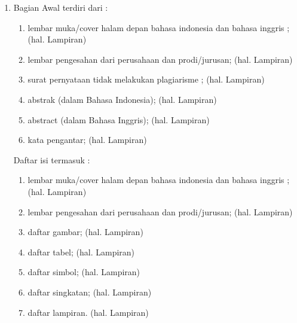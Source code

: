 \begin{enumerate}
\item
Bagian Awal terdiri dari :
\begin{enumerate}
\item lembar muka/cover halam depan bahasa indonesia dan bahasa inggris ; (hal. Lampiran)
\item lembar pengesahan dari perusahaan dan prodi/jurusan; (hal. Lampiran) 
\item surat pernyataan tidak melakukan plagiarisme ; (hal. Lampiran)
\item abstrak (dalam Bahasa Indonesia); (hal. Lampiran)
\item abstract (dalam Bahasa Inggris); (hal. Lampiran)
\item kata pengantar; (hal. Lampiran)
\end{enumerate}
Daftar isi termasuk :
\begin{enumerate}
\item lembar muka/cover halam depan bahasa indonesia dan bahasa inggris ; (hal. Lampiran)
\item lembar pengesahan dari perusahaan dan prodi/jurusan; (hal. Lampiran) 
\item	daftar gambar; (hal. Lampiran)
\item	daftar tabel; (hal. Lampiran)
\item	daftar simbol; (hal. Lampiran)
\item	daftar singkatan; (hal. Lampiran)
\item	daftar lampiran. (hal. Lampiran) 


\end{enumerate}
\end{enumerate}
